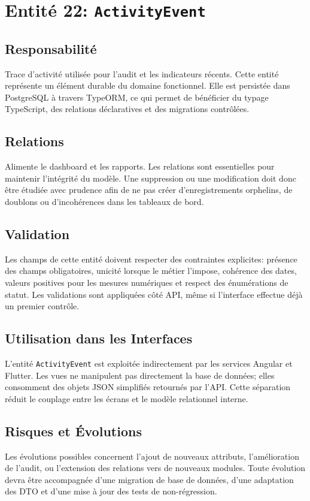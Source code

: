 \section{Entité 22: \texttt{ActivityEvent}}
\subsection{Responsabilité}
Trace d’activité utilisée pour l’audit et les indicateurs récents. Cette entité représente un élément durable du domaine fonctionnel. Elle est persistée dans PostgreSQL à travers TypeORM, ce qui permet de bénéficier du typage TypeScript, des relations déclaratives et des migrations contrôlées.

\subsection{Relations}
Alimente le dashboard et les rapports. Les relations sont essentielles pour maintenir l'intégrité du modèle. Une suppression ou une modification doit donc être étudiée avec prudence afin de ne pas créer d'enregistrements orphelins, de doublons ou d'incohérences dans les tableaux de bord.

\subsection{Validation}
Les champs de cette entité doivent respecter des contraintes explicites: présence des champs obligatoires, unicité lorsque le métier l'impose, cohérence des dates, valeurs positives pour les mesures numériques et respect des énumérations de statut. Les validations sont appliquées côté API, même si l'interface effectue déjà un premier contrôle.

\subsection{Utilisation dans les Interfaces}
L'entité \texttt{ActivityEvent} est exploitée indirectement par les services Angular et Flutter. Les vues ne manipulent pas directement la base de données; elles consomment des objets JSON simplifiés retournés par l'API. Cette séparation réduit le couplage entre les écrans et le modèle relationnel interne.

\subsection{Risques et Évolutions}
Les évolutions possibles concernent l'ajout de nouveaux attributs, l'amélioration de l'audit, ou l'extension des relations vers de nouveaux modules. Toute évolution devra être accompagnée d'une migration de base de données, d'une adaptation des DTO et d'une mise à jour des tests de non-régression.

